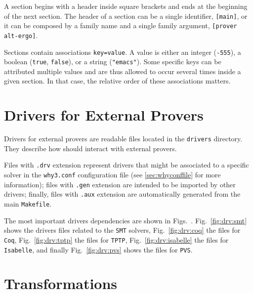 A section begins with a header inside square brackets and ends at the
beginning of the next section. The header of a section can be a single
identifier, \eg \texttt{[main]}, or it can be composed by a family name
and a single family argument, \eg \texttt{[prover alt-ergo]}.

Sections contain associations \texttt{key=value}. A value is either
an integer (\eg \texttt{-555}), a boolean (\texttt{true}, \texttt{false}),
or a string (\eg \texttt{"emacs"}). Some specific keys can be attributed
multiple values and are
thus allowed to occur several times inside a given section. In that
case, the relative order of these associations matters.

\section{Drivers for External Provers}
\label{sec:drivers}

Drivers for external provers are readable files located in the
\texttt{drivers} directory. They describe how \why should interact
with external provers.





Files with \texttt{.drv} extension represent drivers that might be
associated to a specific solver in the \texttt{why3.conf}
configuration file (see \ref{sec:whyconffile} for more information);
files with \texttt{.gen} extension are intended to be imported by
other drivers; finally, files with \texttt{.aux} extension are
automatically generated from the main \texttt{Makefile}.
%

%
The most important drivers dependencies are shown in
Figs.~\driversref. Fig.~\ref{fig:drv:smt} shows the drivers files
related to the \texttt{SMT} solvers, Fig.~\ref{fig:drv:coq} the files
for \texttt{Coq}, Fig.~\ref{fig:drv:tptp} the files for \texttt{TPTP},
Fig.~\ref{fig:drv:isabelle} the files for \texttt{Isabelle}, and
finally Fig.~\ref{fig:drv:pvs} shows the files for \texttt{PVS}.

\section{Transformations}
\label{sec:transformations}

